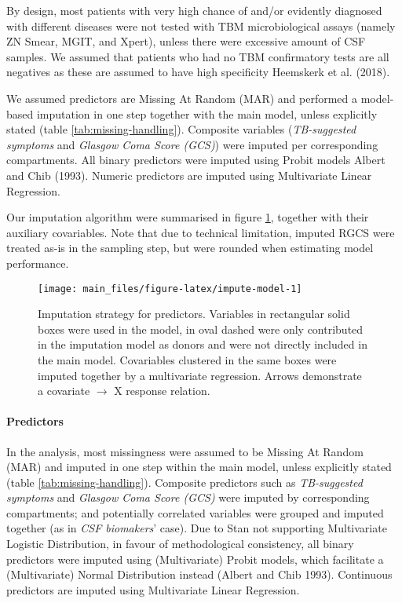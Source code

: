 \documentclass[
]{article}
\begin{document}
By design, most patients with very high chance of and/or evidently diagnosed with different diseases were not tested with TBM microbiological assays (namely ZN Smear, MGIT, and Xpert), unless there were excessive amount of CSF samples. We assumed that patients who had no TBM confirmatory tests are all negatives as these are assumed to have high specificity Heemskerk et al. (2018).

We assumed predictors are Missing At Random (MAR) and performed a model-based imputation in one step together with the main model, unless explicitly stated (table \ref{tab:missing-handling}). Composite variables (\emph{TB-suggested symptoms} and \emph{Glasgow Coma Score (GCS)}) were imputed per corresponding compartments. All binary predictors were imputed using Probit models Albert and Chib (1993). Numeric predictors are imputed using Multivariate Linear Regression.

Our imputation algorithm were summarised in figure \ref{fig:impute-model}, together with their auxiliary covariables. Note that due to technical limitation, imputed RGCS were treated as-is in the sampling step, but were rounded when estimating model performance.

\begin{figure}

{\centering \texttt{[image: main\_files/figure-latex/impute-model-1]} 

}

\caption{Imputation strategy for predictors. Variables in rectangular solid boxes were used in the model, in oval dashed were only contributed in the imputation model as donors and were not directly included in the main model. Covariables clustered in the same boxes were imputed together by a multivariate regression. Arrows demonstrate a covariate $\rightarrow$ X response relation.}\label{fig:impute-model}
\end{figure}

\hypertarget{predictors}{%
\paragraph{Predictors}\label{predictors}}

In the analysis, most missingness were assumed to be Missing At Random (MAR) and imputed in one step within the main model, unless explicitly stated (table \ref{tab:missing-handling}). Composite predictors such as \emph{TB-suggested symptoms} and \emph{Glasgow Coma Score (GCS)} were imputed by corresponding compartments; and potentially correlated variables were grouped and imputed together (as in \emph{CSF biomakers}' case). Due to Stan not supporting Multivariate Logistic Distribution, in favour of methodological consistency, all binary predictors were imputed using (Multivariate) Probit models, which facilitate a (Multivariate) Normal Distribution instead (Albert and Chib 1993). Continuous predictors are imputed using Multivariate Linear Regression.
\end{document}
